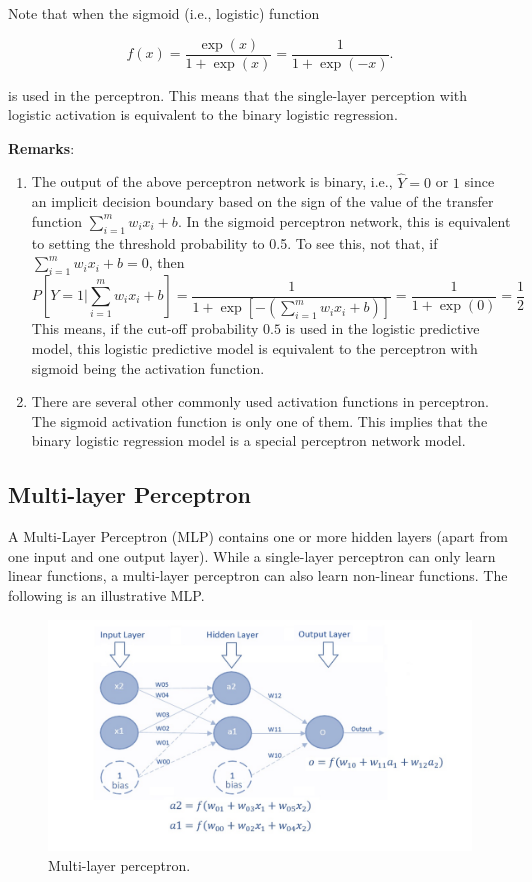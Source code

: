 \documentclass[
]{book}
\begin{document}
Note that when the sigmoid (i.e., logistic) function

\[
f(x) = \frac{\exp(x)}{1 + \exp(x)} = \frac{1}{1+\exp(-x)}.
\]

is used in the perceptron. This means that the single-layer perception with logistic activation is equivalent to the binary logistic regression.

\hfill\break

\textbf{Remarks}:

\begin{enumerate}
\def\labelenumi{\arabic{enumi}.}
\item
  The output of the above perceptron network is binary, i.e., \(\hat{Y} = 0\) or \(1\) since an implicit decision boundary based on the sign of the value of the transfer function \(\sum_{i=1}^m w_ix_i + b\). In the sigmoid perceptron network, this is equivalent to setting the threshold probability to 0.5. To see this, not that, if \(\sum_{i=1}^m w_ix_i + b = 0\), then
  \[
  P\left[Y=1 \Bigg| \sum_{i=1}^m w_ix_i + b\right]=\frac{1}{1+\exp\left[-(\sum_{i=1}^m w_ix_i + b) \right]} = \frac{1}{1+\exp(0)} = \frac{1}{2}
  \]
  This means, if the cut-off probability \(0.5\) is used in the logistic predictive model, this logistic predictive model is equivalent to the perceptron with sigmoid being the activation function.
\item
  There are several other commonly used activation functions in perceptron. The sigmoid activation function is only one of them. This implies that the binary logistic regression model is a special perceptron network model.
\end{enumerate}

\hypertarget{multi-layer-perceptron}{%
\subsection{Multi-layer Perceptron}\label{multi-layer-perceptron}}

A Multi-Layer Perceptron (MLP) contains one or more hidden layers (apart from one input and one output layer). While a single-layer perceptron can only learn linear functions, a multi-layer perceptron can also learn non-linear functions. The following is an illustrative MLP.

\begin{figure}

{\centering \includegraphics[width=0.8\linewidth]{img07/w07-Multilayer-Perceptron} 

}

\caption{Multi-layer perceptron.}\label{fig:unnamed-chunk-143}
\end{figure}
\end{document}
